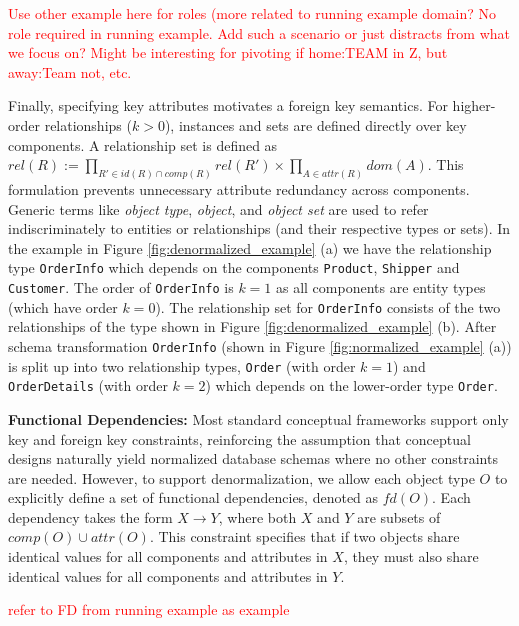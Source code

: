 \documentclass[sigconf]{acmart}
\begin{document}
\textcolor{red}{Use other example here for roles (more related to running example domain? No role required in running example. Add such a scenario or just distracts from what we focus on? Might be interesting for pivoting if home:TEAM in Z, but away:Team not, etc.}

Finally, specifying key attributes motivates a foreign key semantics. For higher-order relationships ($k>0$), instances and sets are defined directly over key components. A relationship set is defined as  $\textit{rel}(R):=\prod_{R'\in\textit{id}(R)\cap\textit{comp}(R)}\textit{rel}(R')\times\prod_{A\in\textit{attr}(R)}\textit{dom}(A)$. This formulation prevents unnecessary attribute redundancy across components. Generic terms like \emph{object type}, \emph{object}, and \emph{object set} are used to refer indiscriminately to entities or relationships (and their respective types or sets). In the example in Figure \ref{fig:denormalized_example} (a) we have the relationship type \texttt{OrderInfo} which depends on the components \texttt{Product}, \texttt{Shipper} and \texttt{Customer}. The order of \texttt{OrderInfo} is $k=1$ as all components are entity types (which have order $k=0$). The relationship set for \texttt{OrderInfo} consists of the two relationships of the type shown in Figure \ref{fig:denormalized_example} (b). After schema transformation \texttt{OrderInfo} (shown in Figure \ref{fig:normalized_example} (a)) is split up into two relationship types, \texttt{Order} (with order $k=1$) and \texttt{OrderDetails} (with order $k=2$) which depends on the lower-order type \texttt{Order}.


\textbf{Functional Dependencies:} Most standard conceptual frameworks support only key and foreign key constraints, reinforcing the assumption that conceptual designs naturally yield normalized database schemas where no other constraints are needed. However, to support denormalization, we allow each object type $O$ to explicitly define a set of functional dependencies, denoted as $\textit{fd}(O)$. Each dependency takes the form $X \rightarrow Y$, where both $X$ and $Y$ are subsets of $\textit{comp}(O) \cup \textit{attr}(O)$. This constraint specifies that if two objects share identical values for all components and attributes in $X$, they must also share identical values for all components and attributes in $Y$.

\textcolor{red}{refer to FD from running example as example}
\end{document}
